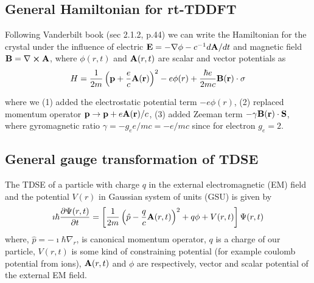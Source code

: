 \documentclass[11pt]{article}
\begin{document}




\subsection{ General Hamiltonian  for rt-TDDFT }


Following  Vanderbilt book \cite{Vanderbilt-book} (sec 2.1.2, p.44) we can  write the Hamiltonian for    
the  crystal  under the influence of electric $\vb E = -\nabla \phi  -c^{-1} d \vb A/dt$ and magnetic field  $\vb B = \nabla \cross \vb A$, where $\phi(r,t)$ and $\vb A(r,t)$ are scalar and vector potentials as 
\begin{align*}
    H = \frac{1}{2m} \left( \vb p  + \frac{e}{c} \vb{ A(r)} \right) ^2  - e \phi(r)  + \frac{\hbar e }{2mc}  \vb{B(r) \cdot \sigma} 
\end{align*}

where we (1) added the electrostatic potential term   $-e \phi(r)$, (2) replaced momentum  operator $\vb p \to \vb p + e \vb{A(r)} /c $,  (3) added Zeeman term
$ -\gamma \vb{B(r) \cdot S }$, where  gyromagnetic   ratio $\gamma = -g_e e /mc = -e/mc $ since for electron $g_e=2$. 


\subsection{ General gauge transformation of TDSE }

The TDSE of a particle with charge $q$ in the external electromagnetic (EM) field and the potential $V(r)$  in Gaussian system of units (GSU) is given by
\begin{align}
\imath \hbar \pdv{\Psi(r,t)}{t} = \left[  \frac{1}{2m} \left(\hat p -\frac{q}{c} \vb A(r,t) \right)^2 + q\phi +V(r,t)  \right]\Psi(r,t)
\label{eq:EM_gauge}
\end{align}
where, $\hat p=-\imath \hbar\nabla_r$, is canonical momentum operator, $q$ is a charge of our particle, $V(r,t)$ is  some kind of constraining potential (for example coulomb potential from ions), $\vb A(r,t)$ and $\phi$ are respectively,    vector  and scalar potential   of the external  EM field.
\end{document}
